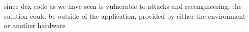 since dex code as we have seen is vulnerable to attacks and reeengineering, the solution could be outside of the application, provided by either the environment or another hardware
